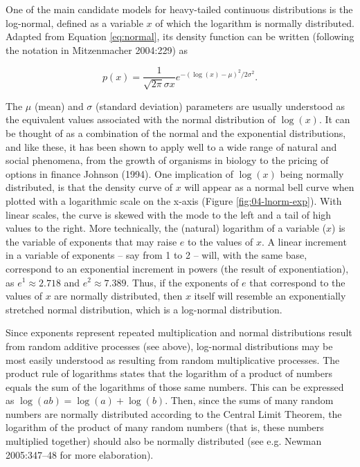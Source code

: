 \documentclass[
  12pt,
]{book}
\begin{document}
One of the main candidate models for heavy-tailed continuous distributions is the log-normal, defined as a variable \(x\) of which the logarithm is normally distributed. Adapted from Equation \eqref{eq:normal}, its density function can be written (following the notation in Mitzenmacher 2004:229) as

\begin{equation}
p(x)=\frac{1}{\sqrt{2\pi}\sigma x}e^{-(\log(x)-\mu)^2/2\sigma^2}.
\label{eq:log-normal}
\end{equation}

The \(\mu\) (mean) and \(\sigma\) (standard deviation) parameters are usually understood as the equivalent values associated with the normal distribution of \(\log(x)\). It can be thought of as a combination of the normal and the exponential distributions, and like these, it has been shown to apply well to a wide range of natural and social phenomena, from the growth of organisms in biology to the pricing of options in finance Johnson (1994). One implication of \(\log (x)\) being normally distributed, is that the density curve of \(x\) will appear as a normal bell curve when plotted with a logarithmic scale on the x-axis (Figure \ref{fig:04-lnorm-exp}). With linear scales, the curve is skewed with the mode to the left and a tail of high values to the right. More technically, the (natural) logarithm of a variable (\(x\)) is the variable of exponents that may raise \(e\) to the values of \(x\). A linear increment in a variable of exponents -- say from 1 to 2 -- will, with the same base, correspond to an exponential increment in powers (the result of exponentiation), as \(e^1 \approx 2.718\) and \(e^2 \approx 7.389\). Thus, if the exponents of \(e\) that correspond to the values of \(x\) are normally distributed, then \(x\) itself will resemble an exponentially stretched normal distribution, which is a log-normal distribution.

Since exponents represent repeated multiplication and normal distributions result from random additive processes (see above), log-normal distributions may be most easily understood as resulting from random multiplicative processes. The product rule of logarithms states that the logarithm of a product of numbers equals the sum of the logarithms of those same numbers. This can be expressed as \(\log (ab) = \log (a) + \log (b)\). Then, since the sums of many random numbers are normally distributed according to the Central Limit Theorem, the logarithm of the product of many random numbers (that is, these numbers multiplied together) should also be normally distributed (see e.g. Newman 2005:347--48 for more elaboration).
\end{document}
